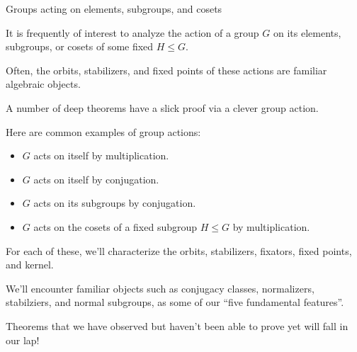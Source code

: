 \documentclass[8pt, handout]{beamer}
\newcommand{\Pause}{}      %
\begin{document}
\begin{frame}{Groups acting on elements, subgroups, and cosets} %
  
  It is frequently of interest to analyze the action of a group $G$ on
  its elements, subgroups, or cosets of some fixed $H\leq G$.
  
  \bigskip\Pause
  
  Often, the orbits, stabilizers, and fixed points of these actions
  are familiar algebraic objects.
  
  \bigskip\Pause
  
  A number of deep theorems have a slick proof via a clever group
  action.
  
  \bigskip\Pause
  
  Here are common examples of group actions: 
  
  \begin{itemize}
  \item $G$ acts on itself by multiplication. \Pause
  \item $G$ acts on itself by conjugation. \Pause
  \item $G$ acts on its subgroups by conjugation. \Pause
  \item $G$ acts on the cosets of a fixed subgroup $H\leq G$ by
    multiplication. \Pause
  \end{itemize}
  
  \smallskip
  
  For each of these, we'll characterize the orbits, stabilizers,
  fixators, fixed points, and kernel.
  
  \bigskip\Pause
  
  We'll encounter familiar objects such as conjugacy classes,
  normalizers, stabilziers, and normal subgroups, as some of our
  ``five fundamental features''. 
  
  \bigskip\Pause
  
  Theorems that we have observed but haven't been able to prove yet
  will fall in our lap!
  
\end{frame}

\end{document}
